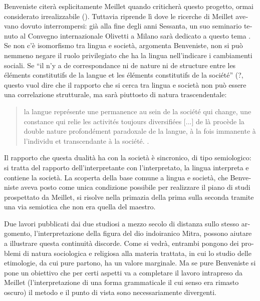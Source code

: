 \documentclass[french,output=paper,colorlinks,citecolor=brown]{../langscibook}
\begin{document}
\begin{otherlanguage}{italian}
Benveniste citerà esplicitamente Meillet quando criticherà questo progetto, ormai considerato irrealizzabile (\citealt[14--15]{Benveniste1966}). Tuttavia riprende lì dove le ricerche di Meillet avevano dovuto interrompersi: già alla fine degli anni Sessanta, un suo seminario tenuto al Convegno internazionale Olivetti a Milano sarà dedicato a questo tema \citep{Benveniste1974}. Se non c’è isomorfismo tra lingua e società, argomenta Benveniste, non si può nemmeno negare il ruolo privilegiato che ha la lingua nell’indicare i cambiamenti sociali. Se “il n’y a de correspondance ni de nature ni de structure entre les éléments constitutifs de la langue et les éléments constitutifs de la société” (\citealt[93]{Benveniste1974}?, questo vuol dire che il rapporto che si cerca tra lingua e società non può essere una correlazione strutturale, ma sarà piuttosto di natura trascendentale:

\begin{quote}
    la langue représente une permanence au sein de la société qui change, une constance qui relie les activités toujours diversifiées [...] de là procède la double nature profondément paradoxale de la langue, à la fois immanente à l’individu et transcendante à la société. \citep[65]{Benveniste1974}.
\end{quote}

Il rapporto che questa dualità ha con la società è sincronico, di tipo semiologico: si tratta del rapporto dell’interpretante con l’interpretato, la lingua interpreta e contiene la società. La scoperta della base comune a lingua e società, che Benveniste aveva posto come unica condizione possibile per realizzare il piano di studi prospettato da Meillet, si risolve nella primazia della prima sulla seconda tramite una via semiotica che non era quella del maestro.\footnotemark{}

Due lavori pubblicati dai due studiosi a mezzo secolo di distanza sullo stesso argomento, l’interpretazione della figura del dio indoiranico Mitra, possono aiutare a illustrare questa continuità discorde. Come si vedrà, entrambi pongono dei problemi di natura sociologica e religiosa alla materia trattata, in cui lo studio delle etimologie, da cui pure partono, ha un valore marginale. Ma se pure Benveniste si pone un obiettivo che per certi aspetti va a completare il lavoro intrapreso da Meillet (l’interpretazione di una forma grammaticale il cui senso era rimasto oscuro) il metodo e il punto di vista sono necessariamente divergenti.


\end{otherlanguage}
\end{document}

